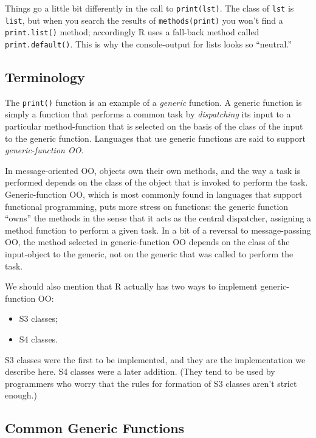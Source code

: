 \documentclass[]{book}
\providecommand{\tightlist}{%
  \setlength{\itemsep}{0pt}\setlength{\parskip}{0pt}}
\theoremstyle{definition}
\theoremstyle{definition}
\theoremstyle{definition}
\theoremstyle{remark}
\begin{document}
{Things go a little bit differently in the call to \texttt{print(lst)}.
The class of \texttt{lst} is \texttt{list}, but when you search the
results of \texttt{methods(print)} you won't find a
\texttt{print.list()} method; accordingly R uses a fall-back method
called \texttt{print.default()}. This is why the console-output for
lists looks so ``neutral.''

\subsection{Terminology}\label{terminology}

The \texttt{print()} function is an example of a \emph{generic}
function.  A generic function is simply a
function that performs a common task by \emph{dispatching} its input to
a particular method-function that is selected on the basis of the class
of the input to the generic function. Languages that use generic
functions are said to support \emph{generic-function OO}.

In message-oriented OO, objects own their own methods, and the way a
task is performed depends on the class of the object that is invoked to
perform the task. Generic-function OO, which is most commonly found in
languages that support functional programming, puts more stress on
functions: the generic function ``owns'' the methods in the sense that
it acts as the central dispatcher, assigning a method function to
perform a given task. In a bit of a reversal to message-passing OO, the
method selected in generic-function OO depends on the class of the
input-object to the generic, not on the generic that was called to
perform the task.

We should also mention that R actually has two ways to implement
generic-function OO:

\begin{itemize}
\tightlist
\item
  S3 classes;
\item
  S4 classes.
\end{itemize}

S3 classes were the first to be implemented, and they are the
implementation we describe here. S4 classes were a later addition. (They
tend to be used by programmers who worry that the rules for formation of
S3 classes aren't strict enough.)

\subsection{Common Generic Functions}\label{common-generic-functions}

}
\end{document}
